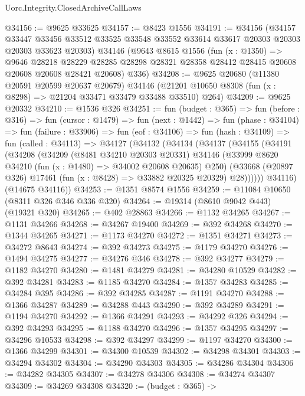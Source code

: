 \begin{lexlean}{Uorc.Integrity.ClosedArchiveCallLaws}
\begin{coremodule}
@34156 := @9625 @33625
@34157 := @8423 @1556
@34191 := @34156
    (@34157
      @33447
      @33456
      @33512
      @33525
      @33548
      @33552
      @33614
      @33617
      @20303
      @20303
      @20303
      @33623
      @20303)
    @34146
    (@9643
      @8615
      @1556
      (fun (x : @1350) =>
      @9646
        @28218
        @28229
        @28285
        @28298
        @28321
        @28358
        @28412
        @28415
        @20608
        @20608
        @20608
        @28421
        @20608)
      @336)
@34208 := @9625
    @20680
    (@11380 @20591 @20599 @20637 @20679)
    @34146
    (@21201 @10650 @8308 (fun (x : @8298) => @21204 @33471 @33479 @33488 @33510) @264)
@34209 := @9625 @20332
@34210 := @1536 @326
@34251 := fun (budget : @365) =>
  fun (before : @316) =>
  fun (cursor : @1479) =>
  fun (next : @1442) =>
  fun (phase : @34104) =>
  fun (failure : @33906) =>
  fun (eof : @34106) =>
  fun (hash : @34109) =>
  fun (called : @34113) =>
  @34127
    (@34132
      (@34134
        (@34137
          (@34155
            (@34191
              (@34208
                (@34209
                  (@8481 @34210 @20303 @20331)
                  @34146
                  (@33999 @8620 @34210 (fun (x : @1480) => @34002 @20608 @20635) @250)
                  (@33668 (@20897 @326) @17461 (fun (x : @8428) => @33882 @20325 @20329) @28))))))
        @34116)
      (@14675 @34116))
@34253 := @1351 @8574 @1556
@34259 := @11084 @10650 (@8311 @326 @346 @336 @320)
@34264 := @19314 (@8610 @9042 @443) (@19321 @320)
@34265 := @402 @28863
@34266 := @1132 @34265
@34267 := @1131 @34266
@34268 := @34267 @19400
@34269 := @392 @34268
@34270 := @1344 @34265
@34271 := @1173 @34270
@34272 := @1351 @34271
@34273 := @34272 @8643
@34274 := @392 @34273
@34275 := @1179 @34270
@34276 := @1494 @34275
@34277 := @34276 @346
@34278 := @392 @34277
@34279 := @1182 @34270
@34280 := @1481 @34279
@34281 := @34280 @10529
@34282 := @392 @34281
@34283 := @1185 @34270
@34284 := @1357 @34283
@34285 := @34284 @395
@34286 := @392 @34285
@34287 := @1191 @34270
@34288 := @1366 @34287
@34289 := @34288 @443
@34290 := @392 @34289
@34291 := @1194 @34270
@34292 := @1366 @34291
@34293 := @34292 @326
@34294 := @392 @34293
@34295 := @1188 @34270
@34296 := @1357 @34295
@34297 := @34296 @10533
@34298 := @392 @34297
@34299 := @1197 @34270
@34300 := @1366 @34299
@34301 := @34300 @10539
@34302 := @34298 @34301
@34303 := @34294 @34302
@34304 := @34290 @34303
@34305 := @34286 @34304
@34306 := @34282 @34305
@34307 := @34278 @34306
@34308 := @34274 @34307
@34309 := @34269 @34308
@34320 := (budget : @365) ->

\end{coremodule}
\end{lexlean}
